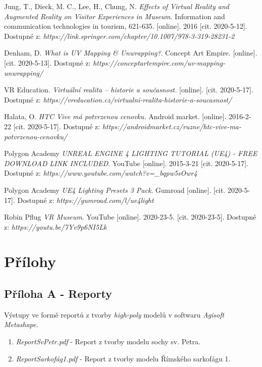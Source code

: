\documentclass[a4paper, 12pt]{report}
\begin{document}
\begin{thebibliography}{9}
 Jung, T., Dieck, M. C., Lee, H., Chung, N. \textit{Effects of Virtual Reality and Augmented Reality on Visitor Experiences in Museum}. Information and communication technologies in tourism, 621-635. [online]. 2016 [cit. 2020-5-12]. Dostupné z: \textit{https://link.springer.com/chapter/10.1007/978-3-319-28231-2}

 Denham, D.\textit{ What is UV Mapping \& Unwrapping?}. Concept Art Empire. [online]. [cit. 2020-5-13]. Dostupné z: \textit{https://conceptartempire.com/uv-mapping-unwrapping/}

 VR Education. \textit{Virtuální realita – historie a současnost.} [online]. [cit. 2020-5-17]. Dostupné z: \textit{https://vreducation.cz/virtualni-realita-historie-a-soucasnost/}

 Halata, O. \textit{HTC Vive má potvrzenou cenovku.} Android market. [online]. 2016-2-22 [cit. 2020-5-17]. Dostupné z: \textit{https://androidmarket.cz/ruzne/htc-vive-ma-potvrzenou-cenovku/}

 Polygon Academy \textit{UNREAL ENGINE 4 LIGHTING TUTORIAL (UE4) - FREE DOWNLOAD LINK INCLUDED}. YouTube [online]. 2015-3-21 [cit. 2020-5-17]. Dostupné z: \textit{https://www.youtube.com/watch?v=\_bqpw5sOwr4}

 Polygon Academy \textit{UE4 Lighting Presets 3 Pack}. Gumroad [online]. [cit. 2020-5-17]. Dostupné z: \textit{https://gumroad.com/l/ue4light}

 Robin Pflug \textit{VR Museum}. YouTube [online]. 2020-23-5. [cit. 2020-23-5]. Dostupné z: \textit{https://youtu.be/7Yv9p6NI5Lk}

\newpage
\chapter{Přílohy}
\section{Příloha A - Reporty}
Výstupy ve formě reportů z tvorby \textit{high-poly} modelů v softwaru \textit{Agisoft Metashape}.

\begin{enumerate}

\item \textit{Report\textunderscore Sv\textunderscore Petr.pdf} - Report z tvorby modelu sochy sv. Petra.

\item \textit{Report\textunderscore Sarkofág\textunderscore 1.pdf} - Report z tvorby modelu Římského sarkofágu 1.


\end{enumerate}
\end{thebibliography}
\end{document}
